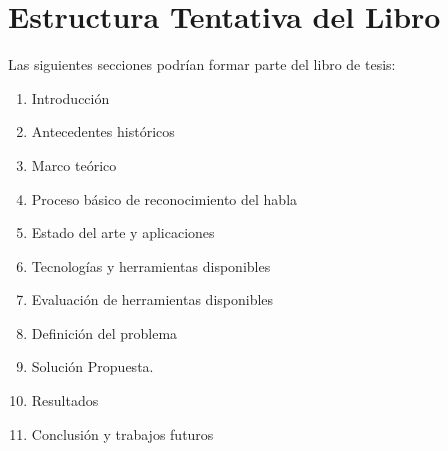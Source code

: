 \section{Estructura Tentativa del Libro}
\label{sec:estructura}

Las siguientes secciones podr\'{i}an formar parte del libro de tesis:

\begin{enumerate}[resume,leftmargin=1.7cm]
\item Introducci\'{o}n
    \item Antecedentes hist\'{o}ricos
    \item Marco te\'{o}rico
    \item Proceso b\'{a}sico de reconocimiento del habla
    \item Estado del arte y aplicaciones
    \item Tecnolog\'{i}as y herramientas disponibles
    \item Evaluaci\'{o}n de herramientas disponibles
    \item Definici\'{o}n del problema
    \item Soluci\'{o}n Propuesta.
    \item Resultados
    \item Conclusi\'{o}n y trabajos futuros
\end{enumerate}
